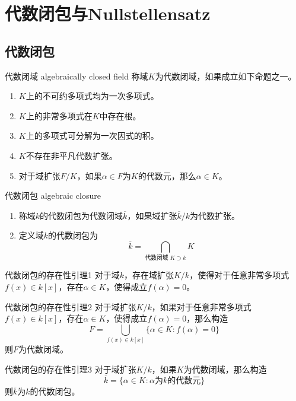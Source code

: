 \section{代数闭包与Nullstellensatz}

\subsection{代数闭包}

\begin{definition}{代数闭域 algebraically closed field}
	称域$K$为代数闭域，如果成立如下命题之一。
	\begin{enumerate}
		\item $K$上的不可约多项式均为一次多项式。
		\item $K$上的非常多项式在$K$中存在根。
		\item $K$上的多项式可分解为一次因式的积。
		\item $K$不存在非平凡代数扩张。
		\item 对于域扩张$F/K$，如果$\alpha\in F$为$K$的代数元，那么$\alpha\in K$。
	\end{enumerate}
\end{definition}

\begin{definition}{代数闭包 algebraic closure}
	\begin{enumerate}
		\item 称域$k$的代数闭包为代数闭域$\overline{k}$，如果域扩张$\overline{k}/k$为代数扩张。
		\item 定义域$k$的代数闭包为
		$$
		\overline{k}=\bigcap_{\text{代数闭域 }K\supset k}K
		$$
	\end{enumerate}
\end{definition}

\begin{lemma}{}{代数闭包的存在性引理1}
	对于域$k$，存在域扩张$K/k$，使得对于任意非常多项式$f(x)\in k[x]$，存在$\alpha\in K$，使得成立$f(\alpha)=0$。
\end{lemma}

\begin{lemma}{}{代数闭包的存在性引理2}
	对于域扩张$K/k$，如果对于任意非常多项式$f(x)\in k[x]$，存在$\alpha\in K$，使得成立$f(\alpha)=0$，那么构造%
	$$
	F=\bigcup_{f(x)\in k[x]}\{ \alpha\in K:f(\alpha)=0 \}
	$$
	则$F$为代数闭域。
\end{lemma}

\begin{lemma}{}{代数闭包的存在性引理3}
	对于域扩张$K/k$，如果$K$为代数闭域，那么构造%
	$$
	\overline{k}=\{ \alpha\in K:\alpha\text{为}k\text{的代数元} \}
	$$
	则$\overline{k}$为$k$的代数闭包。
\end{lemma}

